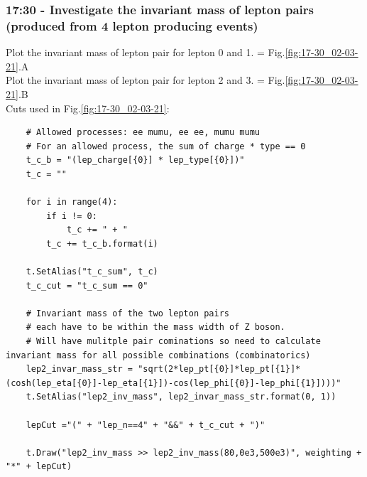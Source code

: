 \subsubsection*{17:30 - Investigate the invariant mass of lepton pairs (produced from 4 lepton producing events)}
Plot the invariant mass of lepton pair for lepton 0 and 1. = Fig.\ref{fig:17-30_02-03-21}.A
\\
Plot the invariant mass of lepton pair for lepton 2 and 3. = Fig.\ref{fig:17-30_02-03-21}.B
\\
Cuts used in Fig.\ref{fig:17-30_02-03-21}:
\begin{lstlisting}
    # Allowed processes: ee mumu, ee ee, mumu mumu
    # For an allowed process, the sum of charge * type == 0 
    t_c_b = "(lep_charge[{0}] * lep_type[{0}])"  
    t_c = ""
    
    for i in range(4):
        if i != 0:
            t_c += " + "
        t_c += t_c_b.format(i)

    t.SetAlias("t_c_sum", t_c)
    t_c_cut = "t_c_sum == 0"
    
    # Invariant mass of the two lepton pairs 
    # each have to be within the mass width of Z boson.
    # Will have mulitple pair cominations so need to calculate invariant mass for all possible combinations (combinatorics)
    lep2_invar_mass_str = "sqrt(2*lep_pt[{0}]*lep_pt[{1}]*(cosh(lep_eta[{0}]-lep_eta[{1}])-cos(lep_phi[{0}]-lep_phi[{1}])))"
    t.SetAlias("lep2_inv_mass", lep2_invar_mass_str.format(0, 1))
    
    lepCut ="(" + "lep_n==4" + "&&" + t_c_cut + ")"
    
    t.Draw("lep2_inv_mass >> lep2_inv_mass(80,0e3,500e3)", weighting + "*" + lepCut)
\end{lstlisting}
